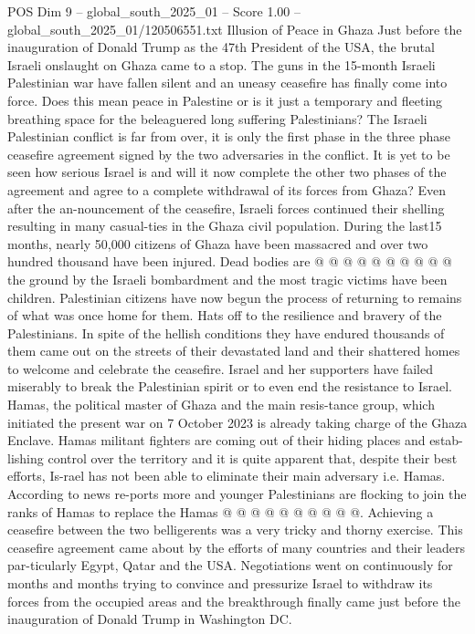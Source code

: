 \begin{textsample}{POS Dim 9 – global\_south\_2025\_01 – Score 1.00 – global\_south\_2025\_01/120506551.txt}  \label{ex:f9_pos_312}
Illusion of Peace in Ghaza Just before the inauguration of Donald Trump as the 47th President of the USA, the brutal Israeli onslaught on Ghaza came to a stop.
The guns in the 15-month Israeli Palestinian war have fallen silent and an uneasy ceasefire has finally come into force.
Does this mean peace in Palestine or is it just a temporary and fleeting breathing space for the beleaguered long suffering Palestinians?
The Israeli Palestinian conflict is far from over, it is only the first phase in the three phase ceasefire agreement signed by the two adversaries in the conflict.
It is yet to be seen how serious Israel is and will it now complete the other two phases of the agreement and agree to a complete withdrawal of its forces from Ghaza?
Even after the an-nouncement of the ceasefire, Israeli forces continued their shelling resulting in many casual-ties in the Ghaza civil population.
During the last15 months, nearly 50,000 citizens of Ghaza have been massacred and over two hundred thousand have been injured.
Dead bodies are @ @ @ @ @ @ @ @ @ @ the ground by the Israeli bombardment and the most tragic victims have been children.
Palestinian citizens have now begun the process of returning to remains of what was once home for them.
Hats off to the resilience and bravery of the Palestinians.
In spite of the hellish conditions they have endured thousands of them came out on the streets of their devastated land and their shattered homes to welcome and celebrate the ceasefire.
Israel and her supporters have failed miserably to break the Palestinian spirit or to even end the resistance to Israel.
Hamas, the political master of Ghaza and the main resis-tance group, which initiated the present war on 7 October 2023 is already taking charge of the Ghaza Enclave.
Hamas militant fighters are coming out of their hiding places and estab-lishing control over the territory and it is quite apparent that, despite their best efforts, Is-rael has not been able to eliminate their main adversary i.e.
Hamas.
According to news re-ports more and younger Palestinians are flocking to join the ranks of Hamas to replace the Hamas @ @ @ @ @ @ @ @ @ @.
Achieving a ceasefire between the two belligerents was a very tricky and thorny exercise.
This ceasefire agreement came about by the efforts of many countries and their leaders par-ticularly Egypt, Qatar and the USA.
Negotiations went on continuously for months and months trying to convince and pressurize Israel to withdraw its forces from the occupied areas and the breakthrough finally came just before the inauguration of Donald Trump in Washington DC.

\end{textsample}
